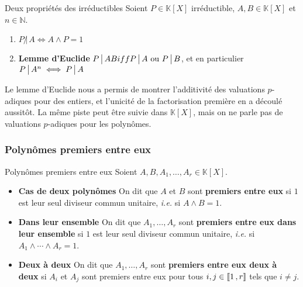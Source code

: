     \begin{prop}{Deux propriétés des irréductibles}{}
        Soient $P \in \mathbb{K}[X]$ irréductible, $A,B \in \mathbb{K}[X]$ et $n \in \mathbb{N}$.
        \begin{enumerate}
            \item $P \, \not| \, A \iff A \wedge P = 1$
            \item \textbf{Lemme d’Euclide} \quad $P \, \big| \, AB iff P \, \big| \, A \text{ ou } P \, \big| \, B$, et en particulier $P \, \big| \, A^n \iff P \, \big| \, A$
        \end{enumerate}
    \end{prop}

    Le lemme d’Euclide nous a permis de montrer l’additivité des valuations $p$-adiques pour des entiers, et l’unicité de la factorisation première en a découlé aussitôt. La même piste peut être suivie dans $\mathbb{K}[X]$, mais on ne parle pas de valuations $p$-adiques pour les polynômes.

    \subsubsection{Polynômes premiers entre eux}

    \begin{defi}{Polynômes premiers entre eux}{}
        Soient $A,B,A_1,\ldots,A_r \in \mathbb{K}[X]$.
        \begin{itemize}
            \item \textbf{Cas de deux polynômes} \quad On dit que $A$ et $B$ sont \textbf{premiers entre eux} si $1$ est leur seul diviseur commun unitaire, \textit{i.e.} si $A \wedge B = 1$.
            \item \textbf{Dans leur ensemble} \quad On dit que $A_1,\ldots,A_r$ sont \textbf{premiers entre eux dans leur ensemble} si $1$ est leur seul diviseur commun unitaire, \textit{i.e.} si $A_1 \wedge \cdots \wedge A_r = 1$.
            \item \textbf{Deux à deux} \quad On dit que $A_1,\ldots,A_r$ sont \textbf{premiers entre eux deux à deux} si $A_i$ et $A_j$ sont premiers entre eux pour tous $i,j \in \left\llbracket 1 \, , r \right\rrbracket$ tels que $i \neq j$.
        \end{itemize}
    \end{defi}

